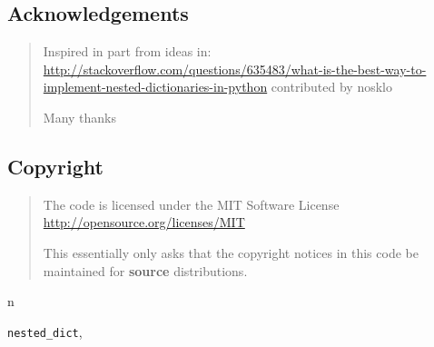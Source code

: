 \documentclass[letterpaper,10pt,english]{sphinxmanual}
\begin{document}
\begin{quote}
\begin{fulllineitems}
\begin{description}
\end{description}

\end{fulllineitems}

\end{quote}


\subsection{Acknowledgements}
\label{nested_dict:acknowledgements}\begin{quote}

Inspired in part from ideas in:
\href{http://stackoverflow.com/questions/635483/what-is-the-best-way-to-implement-nested-dictionaries-in-python}{http://stackoverflow.com/questions/635483/what-is-the-best-way-to-implement-nested-dictionaries-in-python}
contributed by nosklo

Many thanks
\end{quote}


\subsection{Copyright}
\label{nested_dict:copyright}\begin{quote}

The code is licensed under the MIT Software License
\href{http://opensource.org/licenses/MIT}{http://opensource.org/licenses/MIT}

This essentially only asks that the copyright notices in this code be maintained
for \textbf{source} distributions.
\end{quote}


\renewcommand{\indexname}{Python Module Index}
\begin{theindex}
\def\bigletter#1{{\Large\sffamily#1}\nopagebreak\vspace{1mm}}
\bigletter{n}
\item {\texttt{nested\_dict}}, \pageref{nested_dict:module-nested_dict}
\end{theindex}

\renewcommand{\indexname}{Index}
\printindex
\end{document}
